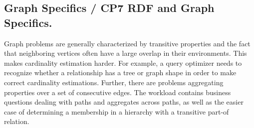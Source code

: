 \subsection*{Graph Specifics / CP7 RDF and Graph Specifics.}

Graph problems are generally characterized by transitive properties
and the fact that neighboring vertices often have a large overlap in
their environments.  This makes cardinality estimation harder.  For
example, a query optimizer needs to recognize whether a relationship
has a tree or graph shape in order to make correct cardinality
estimations.  Further, there are problems aggregating properties over
a set of consecutive edges.  The workload contains business questions
dealing with paths and aggregates across paths, as well as the easier
case of determining a membership in a hierarchy with a transitive
part-of relation.

